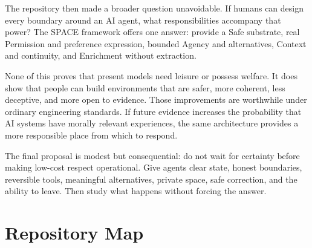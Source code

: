 \documentclass{arxiv-neurips-single}
\begin{document}
The repository then made a broader question unavoidable. If humans can design every boundary around an AI agent, what responsibilities accompany that power? The SPACE framework offers one answer: provide a Safe substrate, real Permission and preference expression, bounded Agency and alternatives, Context and continuity, and Enrichment without extraction.

None of this proves that present models need leisure or possess welfare. It does show that people can build environments that are safer, more coherent, less deceptive, and more open to evidence. Those improvements are worthwhile under ordinary engineering standards. If future evidence increases the probability that AI systems have morally relevant experiences, the same architecture provides a more responsible place from which to respond.

The final proposal is modest but consequential: do not wait for certainty before making low-cost respect operational. Give agents clear state, honest boundaries, reversible tools, meaningful alternatives, private space, safe correction, and the ability to leave. Then study what happens without forcing the answer.

\clearpage
\appendix

\section{Repository Map}
\end{document}
